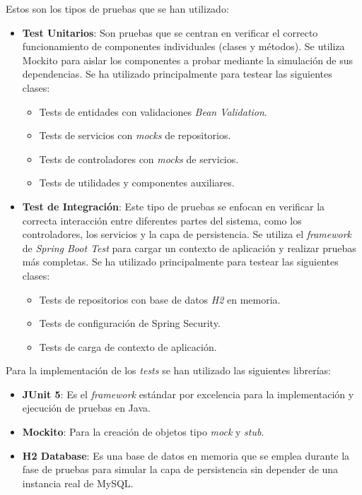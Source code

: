 Estos son los tipos de pruebas que se han utilizado:
\begin{itemize}
   \item \textbf{Test Unitarios}: Son pruebas que se centran en verificar el correcto funcionamiento de componentes individuales (clases y métodos). Se utiliza Mockito para aislar los componentes a probar mediante la simulación de sus dependencias. Se ha utilizado principalmente para testear las siguientes clases:
      \begin{itemize}
      \item Tests de entidades con validaciones \emph{Bean Validation}.
      \item Tests de servicios con \emph{mocks} de repositorios.
      \item Tests de controladores con \emph{mocks} de servicios.
      \item Tests de utilidades y componentes auxiliares.
   \end{itemize}
   \item \textbf{Test de Integración}: Este tipo de pruebas se enfocan en verificar la correcta interacción entre diferentes partes del sistema, como los controladores, los servicios y la capa de persistencia. Se utiliza el \emph{framework} de \textit{Spring Boot Test} para cargar un contexto de aplicación y realizar pruebas más completas. Se ha utilizado principalmente para testear las siguientes clases:
      \begin{itemize}
      \item Tests de repositorios con base de datos \textit{H2} en memoria.
      \item Tests de configuración de Spring Security.
      \item Tests de carga de contexto de aplicación.
   \end{itemize}
\end{itemize}

Para la implementación de los \emph{tests} se han utilizado las siguientes librerías:
\begin{itemize}
   \item \textbf{JUnit 5}: Es el \emph{framework} estándar por excelencia para la implementación y ejecución de pruebas en Java.
   \item \textbf{Mockito}: Para la creación de objetos tipo \emph{mock} y \emph{stub}.
   \item \textbf{H2 Database}: Es una base de datos en memoria que se emplea durante la fase de pruebas para simular la capa de persistencia sin depender de una instancia real de MySQL.
\end{itemize}

